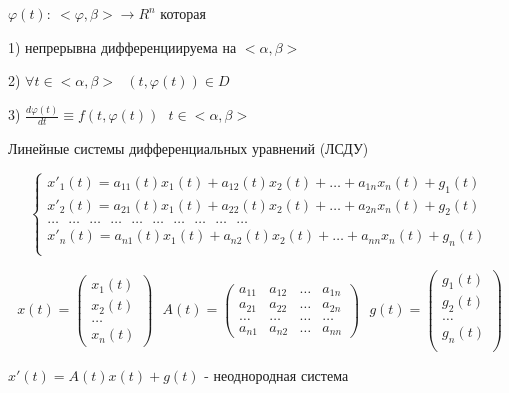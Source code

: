 \begin{block}
  $\varphi(t): ~ <\varphi, \beta> \to R^n$ которая

  1) непрерывна дифференциируема на $<\alpha, \beta>$

  2) $\forall t \in <\alpha, \beta> ~~~ (t, \varphi(t)) \in D$

  3) $\frac{d\varphi(t)}{dt} \equiv f(t, \varphi(t)) ~~~
  t \in <\alpha, \beta>$
\end{block}

\begin{title}[\Large]
  Линейные системы дифференциальных уравнений (ЛСДУ)
\end{title}

$$
\left\{
\begin{array}{l}
  x'_1(t) = a_{11}(t)x_1(t) + a_{12}(t)x_2(t) + \ldots
  + a_{1n}x_n(t) + g_1(t) \\
  x'_2(t) = a_{21}(t)x_1(t) + a_{22}(t)x_2(t) + \ldots
  + a_{2n}x_n(t) + g_2(t) \\
  \ldots ~~~ \ldots ~~~ \ldots ~~~ \ldots ~~~ \ldots ~~~ \ldots ~~~
  \ldots ~~~ \ldots ~~~ \ldots ~~~ \ldots\\
  x'_n(t) = a_{n1}(t)x_1(t) + a_{n2}(t)x_2(t) + \ldots
  + a_{nn}x_n(t) + g_n(t) \\
\end{array}
\right.
$$

$$
x(t) =
\left(
\begin{array}{l}
  x_1(t) \\
  x_2(t) \\
  \ldots \\
  x_n(t)
\end{array}
\right) ~~~
A(t) =
\left(
\begin{array}{cccc}
  a_{11} & a_{12} & \ldots & a_{1n} \\
  a_{21} & a_{22} & \ldots & a_{2n} \\
  \ldots & \ldots & \ldots & \ldots \\
  a_{n1} & a_{n2} & \ldots & a_{nn}
\end{array}
\right) ~~~
g(t) =
\left(
\begin{array}{l}
  g_1(t) \\
  g_2(t) \\
  \ldots \\
  g_n(t) \\
\end{array}
\right)
$$

$x'(t) = A(t)x(t) + g(t)$ - неоднородная система

